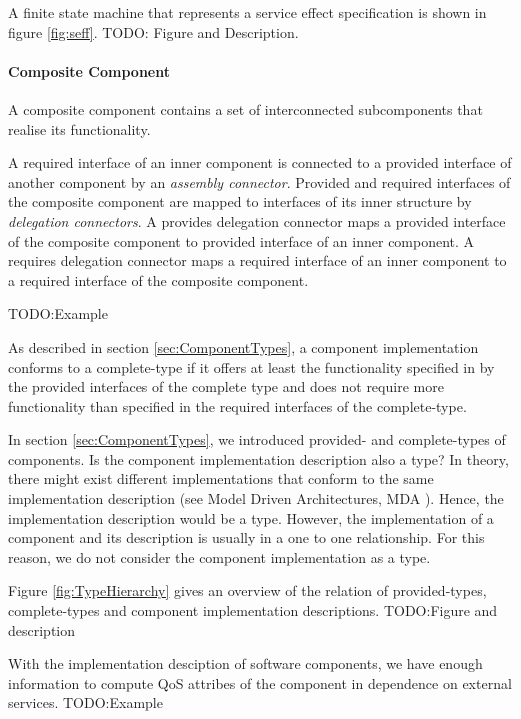 A finite state machine that represents a service effect specification is shown
in figure \ref{fig:seff}. TODO: Figure and Description.


\paragraph*{Composite Component}
A composite component contains a set of interconnected subcomponents that
realise its functionality. 

A required interface of an inner component is connected to a provided interface
of another component by an \emph{assembly connector}. Provided and required
interfaces of the composite component are mapped to interfaces of its inner
structure by \emph{delegation connectors}. A provides delegation connector maps
a provided interface of the composite component to provided interface of an
inner component. A requires delegation connector maps a required interface of an
inner component to a required interface of the composite component.

TODO:Example

As described in section \ref{sec:ComponentTypes}, a component implementation
conforms to a complete-type if it offers at least the functionality specified
in by the provided interfaces of the complete type and does not require more
functionality than specified in the required interfaces of the complete-type.

In section \ref{sec:ComponentTypes}, we introduced provided- and complete-types
of components. Is the component implementation description also a type? In
theory, there might exist different implementations that conform to the same
implementation description (see Model Driven Architectures, MDA
\cite{TODO:reference}). Hence, the implementation description would be a
type. However, the implementation of a component and its description is
usually in a one to one relationship. For this reason, we do not consider the
component implementation as a type. 

Figure \ref{fig:TypeHierarchy} gives an overview of the relation of
provided-types, complete-types and component implementation descriptions.
TODO:Figure and description

With the implementation desciption of software components, we have enough
information to compute QoS attribes of the component in dependence on external
services.
TODO:Example
